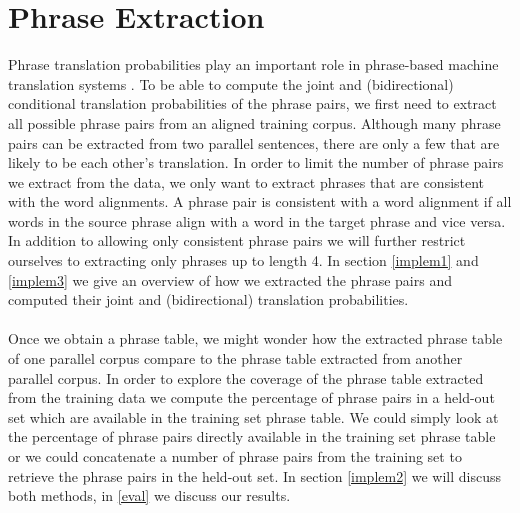 \documentclass[11pt]{article}
\begin{document}
\section{Phrase Extraction}
\label{problem}
Phrase translation probabilities play an important role in phrase-based machine translation systems \cite{koehn}. To be able to compute the joint and (bidirectional) conditional translation probabilities of the phrase pairs, we first need to extract all possible phrase pairs from an aligned training corpus. Although many phrase pairs can be extracted from two parallel sentences, there are only a few that are likely to be each other's translation. In order to limit the number of phrase pairs we extract from the data, we only want to extract phrases that are consistent with the word alignments. A phrase pair is consistent with a word alignment if all words in the source phrase align with a word in the target phrase and vice versa.  In addition to allowing only consistent phrase pairs we will further restrict ourselves to extracting only phrases up to length 4. In section \ref{implem1} and \ref{implem3} we give an overview of how we extracted the phrase pairs and computed their joint and (bidirectional) translation probabilities.\\\\
Once we obtain a phrase table, we might wonder how the extracted phrase table of one parallel corpus compare to the phrase table extracted from another parallel corpus. In order to explore the coverage of the phrase table extracted from the training data we compute the percentage of phrase pairs in a held-out set which are available in the training set phrase table. We could simply look at the percentage of phrase pairs directly available in the training set phrase table or we could concatenate a number of phrase pairs from the training set to retrieve the phrase pairs in the held-out set. In section \ref{implem2} we will discuss both methods, in \ref{eval} we discuss our results.
\end{document}
